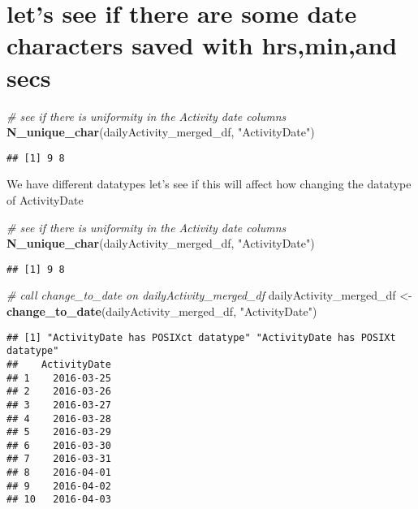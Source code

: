 \documentclass[
]{article}
\newenvironment{Shaded}{\begin{snugshade}}{\end{snugshade}}
\newcommand{\CommentTok}[1]{\textcolor[rgb]{0.56,0.35,0.01}{\textit{#1}}}
\newcommand{\FunctionTok}[1]{\textcolor[rgb]{0.13,0.29,0.53}{\textbf{#1}}}
\newcommand{\NormalTok}[1]{#1}
\newcommand{\OtherTok}[1]{\textcolor[rgb]{0.56,0.35,0.01}{#1}}
\newcommand{\StringTok}[1]{\textcolor[rgb]{0.31,0.60,0.02}{#1}}
\begin{document}
\section{let's see if there are some date characters saved with
hrs,min,and
secs}\label{lets-see-if-there-are-some-date-characters-saved-with-hrsminand-secs}

\begin{Shaded}
\begin{Highlighting}[]
\CommentTok{\# see if there is uniformity in the Activity date columns}
\FunctionTok{N\_unique\_char}\NormalTok{(dailyActivity\_merged\_df, }\StringTok{"ActivityDate"}\NormalTok{)}
\end{Highlighting}
\end{Shaded}

\begin{verbatim}
## [1] 9 8
\end{verbatim}

We have different datatypes let's see if this will affect how changing
the datatype of ActivityDate

\begin{Shaded}
\begin{Highlighting}[]
\CommentTok{\# see if there is uniformity in the Activity date columns}
\FunctionTok{N\_unique\_char}\NormalTok{(dailyActivity\_merged\_df, }\StringTok{"ActivityDate"}\NormalTok{)}
\end{Highlighting}
\end{Shaded}

\begin{verbatim}
## [1] 9 8
\end{verbatim}

\begin{Shaded}
\begin{Highlighting}[]
\CommentTok{\# call change\_to\_date on dailyActivity\_merged\_df}
\NormalTok{dailyActivity\_merged\_df }\OtherTok{\textless{}{-}} \FunctionTok{change\_to\_date}\NormalTok{(dailyActivity\_merged\_df, }\StringTok{"ActivityDate"}\NormalTok{)}
\end{Highlighting}
\end{Shaded}

\begin{verbatim}
## [1] "ActivityDate has POSIXct datatype" "ActivityDate has POSIXt datatype" 
##    ActivityDate
## 1    2016-03-25
## 2    2016-03-26
## 3    2016-03-27
## 4    2016-03-28
## 5    2016-03-29
## 6    2016-03-30
## 7    2016-03-31
## 8    2016-04-01
## 9    2016-04-02
## 10   2016-04-03
\end{verbatim}
\end{document}
